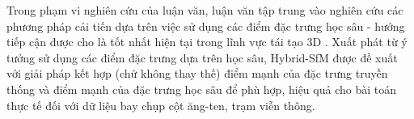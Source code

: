 Trong phạm vi nghiên cứu của luận văn, luận văn tập trung vào nghiên cứu các phương pháp cải tiến dựa trên việc sử dụng các điểm đặc trưng học sâu - hướng tiếp cận được cho là tốt nhất hiện tại trong lĩnh vực tái tạo 3D \cite{Liu_2023_CVPR}. Xuất phát từ ý tưởng sử dụng các điểm đặc trưng dựa trên học sâu, Hybrid-SfM được đề xuất với giải pháp kết hợp (chứ không thay thế) điểm mạnh của đặc trưng truyền thống và điểm mạnh của đặc trưng học sâu để phù hợp, hiệu quả cho bài toán thực tế đối với dữ liệu bay chụp cột ăng-ten, trạm viễn thông. 






